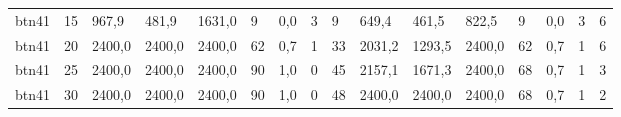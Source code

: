 \begin{table}[]
\begin{tabular}{llllllllllllllll}
		btn41   & 15     & 967,9                                               & 481,9                                               & 1631,0                                              & 9                                                   & 0,0                                                 & 3      & 9                                                         & 649,4                                               & 461,5                                               & 822,5                                               & 9                                                   & 0,0                                                 & 3      & 6                                                         \\
		btn41   & 20     & 2400,0                                              & 2400,0                                              & 2400,0                                              & 62                                                  & 0,7                                                 & 1      & 33                                                        & 2031,2                                              & 1293,5                                              & 2400,0                                              & 62                                                  & 0,7                                                 & 1      & 6                                                         \\
		btn41   & 25     & 2400,0                                              & 2400,0                                              & 2400,0                                              & 90                                                  & 1,0                                                 & 0      & 45                                                        & 2157,1                                              & 1671,3                                              & 2400,0                                              & 68                                                  & 0,7                                                 & 1      & 3                                                         \\
		btn41   & 30     & 2400,0                                              & 2400,0                                              & 2400,0                                              & 90                                                  & 1,0                                                 & 0      & 48                                                        & 2400,0                                              & 2400,0                                              & 2400,0                                              & 68                                                  & 0,7                                                 & 1      & 2                                                         \\

\end{tabular}
\end{table}
